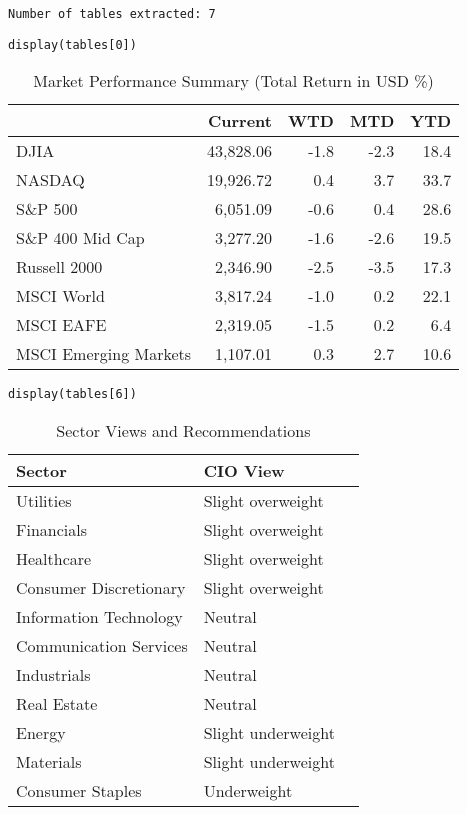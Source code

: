 \begin{verbatim}
Number of tables extracted: 7
\end{verbatim}

\begin{verbatim}
display(tables[0])
\end{verbatim}

\begin{table}[H]
\centering
\begin{tabular}{lrrrr}
\hline
 & Current & WTD & MTD & YTD \\
\hline
DJIA & 43,828.06 & -1.8 & -2.3 & 18.4 \\
NASDAQ & 19,926.72 & 0.4 & 3.7 & 33.7 \\
S\&P 500 & 6,051.09 & -0.6 & 0.4 & 28.6 \\
S\&P 400 Mid Cap & 3,277.20 & -1.6 & -2.6 & 19.5 \\
Russell 2000 & 2,346.90 & -2.5 & -3.5 & 17.3 \\
MSCI World & 3,817.24 & -1.0 & 0.2 & 22.1 \\
MSCI EAFE & 2,319.05 & -1.5 & 0.2 & 6.4 \\
MSCI Emerging Markets & 1,107.01 & 0.3 & 2.7 & 10.6 \\
\hline
\end{tabular}
\caption{Market Performance Summary (Total Return in USD \%)}
\label{tab:market-performance}
\end{table}

\begin{verbatim}
display(tables[6])
\end{verbatim}

\begin{table}[H]
\centering
\begin{tabular}{lll}
\hline
Sector & CIO View \\
\hline
Utilities & Slight overweight \\
Financials & Slight overweight \\
Healthcare & Slight overweight \\
Consumer Discretionary & Slight overweight \\
Information Technology & Neutral \\
Communication Services & Neutral \\
Industrials & Neutral \\
Real Estate & Neutral \\
Energy & Slight underweight \\
Materials & Slight underweight \\
Consumer Staples & Underweight \\
\hline
\end{tabular}
\caption{Sector Views and Recommendations}
\label{tab:sector-views}
\end{table}


